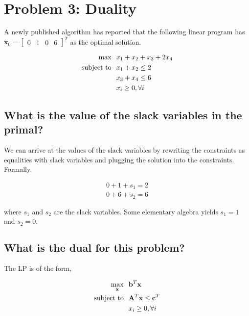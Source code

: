\documentclass{article}
\begin{document}
\newpage

\section{Problem 3: Duality}

A newly published algorithm has reported that the following linear program has $\mathbf{x}_0 = \begin{bmatrix} 0 & 1 & 0 & 6 \end{bmatrix}^T$ as the optimal solution.

\begin{align*}
\text{max} & \hspace{0.1in} x_1 + x_2 + x_3 + 2x_4\\
\text{subject to} & \hspace{0.1in} x_1 + x_2 \le 2\\
& \hspace{0.1in} x_3 + x_4 \le 6\\
& \hspace{0.1in} x_i \ge 0, \forall i
\end{align*}

\subsection{What is the value of the slack variables in the primal?} \label{sec:slack_primal}

We can arrive at the values of the slack variables by rewriting the constraints as equalities with slack variables and plugging the solution into the constraints. Formally,

\begin{align*}
0 + 1 + s_1 = 2\\
0 + 6 + s_2 = 6
\end{align*}

\noindent where $s_1$ and $s_2$ are the slack variables. Some elementary algebra yields $s_1 = 1$ and $s_2 = 0$.

\subsection{What is the dual for this problem?}

The LP is of the form,

\begin{align*}
\max_\mathbf{x} & \hspace{0.1in} \mathbf{b}^T \mathbf{x}\\
\text{subject to} & \hspace{0.1in} \mathbf{A}^T \mathbf{x} \le \mathbf{c}^T\\
& \hspace{0.1in} x_i \ge 0, \forall i
\end{align*}
\end{document}
